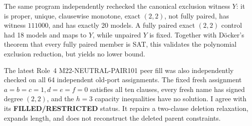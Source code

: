 \documentclass[11pt]{article}
\begin{document}
The same program independently rechecked the canonical exclusion witness $Y$: it is proper, unique, clausewise monotone, exact $(2,2)$, not fully paired, has witness $111000$, and has exactly 20 models.  A fully paired exact $(2,2)$ control had 18 models and maps to $Y$, while unpaired $Y$ is fixed.  Together with D\"ocker's theorem that every fully paired member is SAT, this validates the polynomial exclusion reduction, but yields no lower bound.

The latest Role~4 M22-NEUTRAL-PAIR101 peer fill was also independently checked on all 64 independent old-port assignments.  The fixed fresh assignment $a=b=c=1,d=e=f=0$ satisfies all ten clauses, every fresh name has signed degree $(2,2)$, and the $h=3$ capacity inequalities have no solution.  I agree with its \textbf{FILLED/RESTRICTED} status.  It repairs a two-clause deletion relaxation, expands length, and does not reconstruct the deleted parent constraints.
\end{document}
